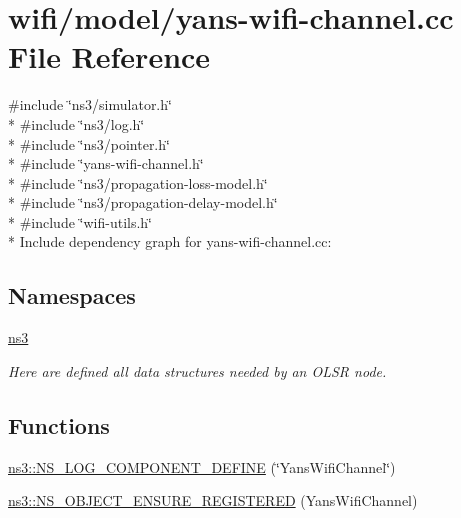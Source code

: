 \hypertarget{yans-wifi-channel_8cc}{}\section{wifi/model/yans-\/wifi-\/channel.cc File Reference}
\label{yans-wifi-channel_8cc}
{\ttfamily \#include \char`\"{}ns3/simulator.\+h\char`\"{}}\\*
{\ttfamily \#include \char`\"{}ns3/log.\+h\char`\"{}}\\*
{\ttfamily \#include \char`\"{}ns3/pointer.\+h\char`\"{}}\\*
{\ttfamily \#include \char`\"{}yans-\/wifi-\/channel.\+h\char`\"{}}\\*
{\ttfamily \#include \char`\"{}ns3/propagation-\/loss-\/model.\+h\char`\"{}}\\*
{\ttfamily \#include \char`\"{}ns3/propagation-\/delay-\/model.\+h\char`\"{}}\\*
{\ttfamily \#include \char`\"{}wifi-\/utils.\+h\char`\"{}}\\*
Include dependency graph for yans-\/wifi-\/channel.cc\+:
\subsection*{Namespaces}
\begin{DoxyCompactItemize}
\item 
 \hyperlink{namespacens3}{ns3}
\begin{DoxyCompactList}\small\item\em Here are defined all data structures needed by an O\+L\+SR node. \end{DoxyCompactList}\end{DoxyCompactItemize}
\subsection*{Functions}
\begin{DoxyCompactItemize}
\item 
\hyperlink{namespacens3_a7ff7777491bc5af910be00ba7fe7a3f2}{ns3\+::\+N\+S\+\_\+\+L\+O\+G\+\_\+\+C\+O\+M\+P\+O\+N\+E\+N\+T\+\_\+\+D\+E\+F\+I\+NE} (\char`\"{}Yans\+Wifi\+Channel\char`\"{})
\item 
\hyperlink{namespacens3_a5c18b0a8df72dde5d021ede72a5b4e95}{ns3\+::\+N\+S\+\_\+\+O\+B\+J\+E\+C\+T\+\_\+\+E\+N\+S\+U\+R\+E\+\_\+\+R\+E\+G\+I\+S\+T\+E\+R\+ED} (Yans\+Wifi\+Channel)
\end{DoxyCompactItemize}
